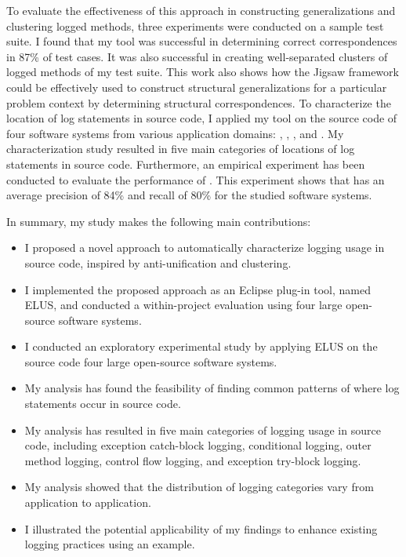 To evaluate the effectiveness of this approach in constructing generalizations and clustering logged methods, three experiments were conducted on a sample test suite. I found that my tool was successful in determining correct correspondences in 87\% of test cases. It was also successful in creating well-separated clusters of logged methods of my test suite. This work also shows how the Jigsaw framework could be effectively used to construct structural generalizations for a particular problem context by determining structural correspondences. To characterize the location of log statements in source code, I applied my tool on the source code of four software systems from various application domains: , , , and . My characterization study resulted in five main categories of locations of log statements in source code. Furthermore, an empirical experiment has been conducted to evaluate the performance of . This experiment shows that  has an average precision of 84\% and recall of 80\% for the studied software systems.

In summary, my study makes the following main contributions:
\begin{itemize} [leftmargin=.5in]
\item I proposed a novel approach to automatically characterize logging usage in source code, inspired by anti-unification and clustering.
\item I implemented the proposed approach as an Eclipse plug-in tool, named ELUS, and conducted a within-project evaluation using four large open-source software systems.
\item I conducted an exploratory experimental study by applying ELUS on the source code four large open-source software systems.
\item My analysis has found the feasibility of finding common patterns of where log statements occur in source code.
\item My analysis has resulted in five main categories of logging usage in source code, including exception catch-block logging, conditional logging, outer method logging, control flow logging, and exception try-block logging.
\item My analysis showed that the distribution of logging categories vary from application to application.
\item I illustrated the potential applicability of my findings to enhance existing logging practices using an example.
\end{itemize}




